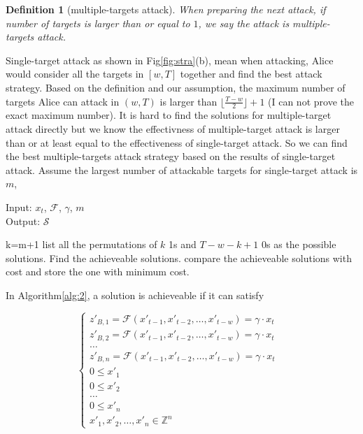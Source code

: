 \documentclass[journal]{IEEEtran}
\newtheorem{definition}{Definition}
\begin{document}
{\begin{definition}[multiple-targets attack]
When preparing the next attack, if number of targets is larger than or equal to $1$, we say the attack is multiple-targets attack.
\end{definition}

Single-target attack as shown in Fig\ref{fig:stra}(b), mean when attacking, Alice would consider all the targets in $[w,T]$ together and find the best attack strategy. Based on the definition and our assumption, the maximum number of targets Alice can attack in $(w,T)$ is larger than $\lfloor \frac{T-w}{2} \rfloor +1$ (I can not prove the exact maximum number). It is hard to find the solutions for multiple-target attack directly but we know the effectivness of multiple-target attack is larger than or at least equal to the effectiveness of single-target attack. So we can find the best multiple-targets attack strategy based on the results of single-target attack. Assume the largest number of attackable targets for single-target attack is $m$,


\begin{algorithm}
\caption{Algorithm 2 to find the maximum targets with multiple-targets attack}
Input:
$x_t$, $\mathcal{F}$, $\gamma$, $m$\\
Output: $\mathcal{S}$
\begin{algorithmic}[2]\label{alg:2}
\STATE k=m+1
\REPEAT
    \STATE list all the permutations of $k$ 1s and $T-w-k+1$ 0s as the possible solutions.
    \STATE Find the achieveable solutions.
    \STATE compare the achieveable solutions with cost and store the one with minimum cost.
\end{algorithmic}
\end{algorithm}

In Algorithm\ref{alg:2}, a solution is achieveable if it can satisfy

\begin{equation}
\left\{
             \begin{array}{lr}
             z'_{B,1}=\mathcal{F}(x'_{t-1}, x'_{t-2}, \dots, x'_{t-w})=\gamma \cdot x_t &  \\
             z'_{B,2}=\mathcal{F}(x'_{t-1}, x'_{t-2}, \dots, x'_{t-w})=\gamma \cdot x_t &  \\
             \dots                                                                         \\
             z'_{B,n}=\mathcal{F}(x'_{t-1}, x'_{t-2}, \dots, x'_{t-w})=\gamma \cdot x_t &  \\
             0 \leq x'_1\\
             0 \leq x'_2\\
             \dots          \\
             0 \leq x'_n\\
             x'_{1}, x'_{2}, \dots, x'_{n}\in\mathbb{Z}^{n}
             \end{array}
\right.
\end{equation}

}
\end{document}
